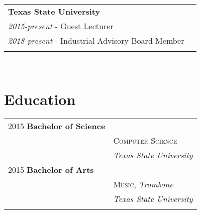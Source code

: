 \documentclass[10pt]{article} %
\newcommand\tab[1][1cm]{\hspace*{#1}}
\begin{document}
\begin{minipage}[t]{0.44\textwidth}
\begin{tabular}{ll}
\textbf{Texas State University}\\
\tab\textit{2015-present} - Guest Lecturer\\
\tab\textit{2018-present} - Industrial Advisory Board Member\\
\\

\end{tabular}\\



\section{Education} 

\begin{tabular}{ll} %

2015 \textbf{Bachelor of Science} \\ 
& \textsc{Computer Science} \\ 
& \textit{Texas State University}\\

	 

2015 \textbf{Bachelor of Arts} \\ 
& \textsc{Music}, \textit{Trombone}\\ 
& \textit{Texas State University}\\ \\

\end{tabular}






	
\end{minipage} %
\end{document}
